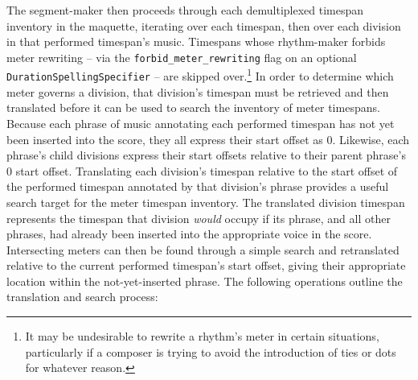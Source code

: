 The segment-maker then proceeds through each demultiplexed timespan inventory
in the maquette, iterating over each timespan, then over each division in that
performed timespan's music. Timespans whose rhythm-maker forbids meter
rewriting -- via the \texttt{forbid\_meter\_rewriting} flag on an optional
\texttt{Duration\-Spelling\-Specifier} -- are skipped over.\footnote{It may be
undesirable to rewrite a rhythm's meter in certain situations, particularly if
a composer is trying to avoid the introduction of ties or dots for whatever
reason.} In order to determine which meter governs a division, that division's
timespan must be retrieved and then translated before it can be used to search
the inventory of meter timespans. Because each phrase of music annotating each
performed timespan has not yet been inserted into the score, they all express
their start offset as 0. Likewise, each phrase's child divisions express their
start offsets relative to their parent phrase's 0 start offset. Translating
each division's timespan relative to the start offset of the performed timespan
annotated by that division's phrase provides a useful search target for the
meter timespan inventory. The translated division timespan represents the
timespan that division \emph{would} occupy if its phrase, and all other
phrases, had already been inserted into the appropriate voice in the score.
Intersecting meters can then be found through a simple search and retranslated
relative to the current performed timespan's start offset, giving their
appropriate location within the not-yet-inserted phrase. The following
operations outline the translation and search process:

\begin{comment}
<abjad>
inscribed_timespan = consort.PerformedTimespan(
    start_offset=(5, 4),
    stop_offset=(9, 5),
    music=Container("{ c'4 }{ c'2 }{ c'4 }"),
    )
division = inscribed_timespan.music[1]
division_timespan = inspect_(division).get_timespan()
print(format(division_timespan))
translation = inscribed_timespan.start_offset
division_timespan = division_timespan.translate(translation)
print(format(division_timespan))
meter_timespan = meter_timespans.find_timespans_intersecting_timespan(
    division_timespan)[0]
print(format(meter_timespan))
translation = -1 * division_timespan.start_offset
meter_timespan = meter_timespan.translate(translation)
print(format(meter_timespan))
</abjad>
\end{comment}

